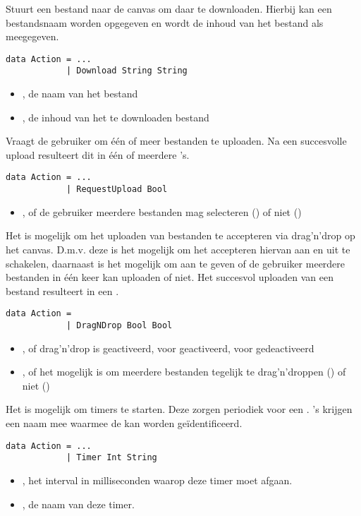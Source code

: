 Stuurt een bestand naar de canvas om daar te downloaden. Hierbij kan een bestandsnaam worden opgegeven en wordt de inhoud van het bestand als  meegegeven.
\begin{lstlisting}
data Action = ...
			| Download String String
\end{lstlisting}
\begin{itemize}
	\item {}, de naam van het bestand
	\item {}, de inhoud van het te downloaden bestand
\end{itemize}

Vraagt de gebruiker om één of meer bestanden te uploaden. Na een succesvolle upload resulteert dit in één of meerdere 's.
\begin{lstlisting}
data Action = ...
			| RequestUpload Bool
\end{lstlisting}
\begin{itemize}
	\item {}, of de gebruiker meerdere bestanden mag selecteren () of niet ()
\end{itemize}

Het is mogelijk om het uploaden van bestanden te accepteren via drag'n'drop op het canvas. D.m.v. deze  is het mogelijk om het accepteren hiervan aan en uit te schakelen, daarnaast is het mogelijk om aan te geven of de gebruiker meerdere bestanden in één keer kan uploaden of niet. Het succesvol uploaden van een bestand resulteert in een .
\begin{lstlisting}
data Action = 
			| DragNDrop Bool Bool
\end{lstlisting}
\begin{itemize}
	\item {}, of drag'n'drop is geactiveerd,  voor geactiveerd,  voor gedeactiveerd
	\item {}, of het mogelijk is om meerdere bestanden tegelijk te drag'n'droppen () of niet ()
\end{itemize}

Het is mogelijk om timers te starten. Deze zorgen periodiek voor een . 's krijgen een naam mee waarmee de  kan worden geïdentificeerd.
\begin{lstlisting}
data Action = ...
			| Timer Int String
\end{lstlisting}
\begin{itemize}
	\item {}, het interval in milliseconden waarop deze timer moet afgaan.
	\item {}, de naam van deze timer.
\end{itemize}

